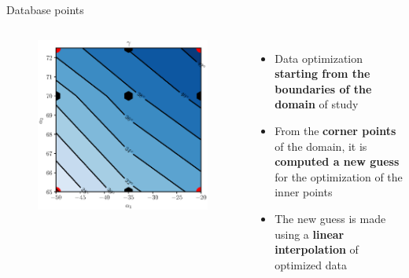 \begin{frame}{Database points}
{\begin{columns}
            \begin{figure}
                \centering
                \includegraphics[scale=0.5]{images/staggerLinear2.eps}
            \end{figure}
            \begin{itemize}
                \item Data optimization \textbf{starting from the boundaries of the domain} of study
                \item From the \textbf{corner points} of the domain, it is \textbf{computed a new guess} for the optimization of the inner points
                \item The new guess is made using a \textbf{linear interpolation} of optimized data 
            \end{itemize}
        \end{columns}
    }
\end{frame}
